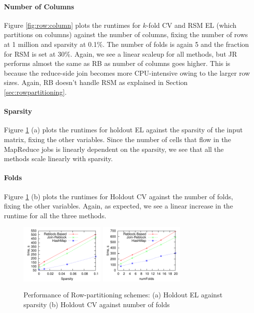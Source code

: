 \documentclass{vldb}
\begin{document}
\paragraph*{Number of Columns}
Figure \ref{fig:row:column} plots
the runtimes for $k$-fold CV and RSM EL (which partitions on columns)
against the number of columns, fixing
the number of rows at 1 million and sparsity at 0.1\%. The number of folds is
again 5 and the fraction for RSM is set at 30\%. Again, we see a linear scaleup
for all methods, but JR performs almost the same as RB as number of columns
goes higher. This is because the reduce-side join becomes more CPU-intensive
owing to the larger row sizes. Again, RB doesn't handle RSM as explained in
Section \ref{sec:rowpartitioning}.

\paragraph*{Sparsity}
Figure \ref{fig:row:sparsity:fold} (a) plots
the runtimes for holdout EL against the sparsity of the input matrix, fixing the other
variables. Since the number of cells that flow in the MapReduce jobs is linearly dependent
on the sparsity, we see that all the methods scale linearly with sparsity.

\paragraph*{Folds}
Figure \ref{fig:row:sparsity:fold} (b) plots
the runtimes for Holdout CV against the number of folds, fixing the other variables. Again,
as expected, we see a linear increase in the runtime for all the three methods.

\begin{figure}[h]
\centering
\includegraphics[width=1.64in]{row/sparsity.pdf}
\includegraphics[width=1.64in]{row/fold-cv.pdf}
\caption{Performance of Row-partitioning schemes: (a) Holdout EL against sparsity (b) Holdout
CV against number of folds}
\label{fig:row:sparsity:fold}
\end{figure}
\end{document}
